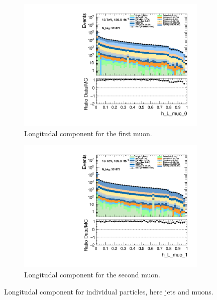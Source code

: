 \begin{figure}
\begin{subfigure}{.49\textwidth}
        \includegraphics[width=\textwidth]{Figures/MC_Data_comp/h_L_muo_0.pdf}
        \caption{Longitudal component for the first muon.}
        \label{fig:h_L_muo_0}
    \end{subfigure}
    \hfill
    \begin{subfigure}{.49\textwidth}
        \includegraphics[width=\textwidth]{Figures/MC_Data_comp/h_L_muo_1.pdf}
        \caption{Longitudal component for the second muon.}
        \label{fig:h_L_muo_1}
    \end{subfigure}
    \hfill       
    \caption{Longitudal component for individual particles, here jets and muons.}
    \label{fig:batch7_feats}
\end{figure}

